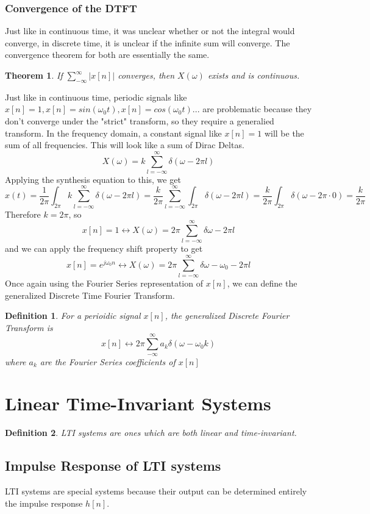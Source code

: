\documentclass{article}
\newtheorem{theorem}{Theorem}
\newtheorem{definition}{Definition}
\begin{document}
\subsubsection{Convergence of the DTFT}
Just like in continuous time, it was unclear whether or not the integral would converge,
in discrete time, it is unclear if the infinite sum will converge. The convergence theorem for both are essentially the same.
\begin{theorem}
    If $\sum_{-\infty}^{\infty}{|x[n]|}$ converges, then $X(\omega)$ exists and is continuous.
\end{theorem}
Just like in continuous time, periodic signals like $x[n] = 1, x[n] = sin(\omega_0t), x[n]=cos(\omega_0t)...$
are problematic because they don't converge under the "strict" transform, so they require a generalied transform.
In the frequency domain, a constant signal like $x[n] = 1$ will be the sum of all frequencies. This will look like
a sum of Dirac Deltas.
$$X(\omega) = k \sum_{l=-\infty}^{\infty}{\delta(\omega - 2\pi l)}$$
Applying the synthesis equation to this, we get
$$x(t) = \frac{1}{2\pi}\int_{2\pi}{k \sum_{l=-\infty}^{\infty}{\delta(\omega - 2\pi l)}} = \frac{k}{2\pi}\sum_{l=-\infty}^{\infty}{\int_{2\pi}{\delta(\omega - 2\pi l)}} = \frac{k}{2\pi}\int_{2\pi}{\delta(\omega - 2\pi \cdot 0)} = \frac{k}{2\pi}$$
Therefore $k = 2\pi$, so
$$x[n] = 1 \leftrightarrow X(\omega) = 2\pi\sum_{l=-\infty}^{\infty}{\delta{\omega - 2\pi l}}$$
and we can apply the frequency shift property to get
$$x[n] = e^{j\omega_0n} \leftrightarrow X(\omega) = 2\pi\sum_{l=-\infty}^{\infty}{\delta{\omega - \omega_0 - 2\pi l}}$$
Once again using the Fourier Series representation of $x[n]$, we can define the generalized Discrete Time Fourier Transform.
\begin{definition}
    For a perioidic signal $x[n]$, the generalized Discrete Fourier Transform is
    $$x[n] \leftrightarrow 2\pi\sum_{-\infty}^{\infty}{a_k\delta(\omega-\omega_0k)}$$
    where $a_k$ are the Fourier Series coefficients of $x[n]$
\end{definition}
\section{Linear Time-Invariant Systems}
\begin{definition}
    LTI systems are ones which are both linear and time-invariant.
\end{definition}
\subsection{Impulse Response of LTI systems}
LTI systems are special systems because their output can be determined entirely the impulse response $h[n]$.
\end{document}
